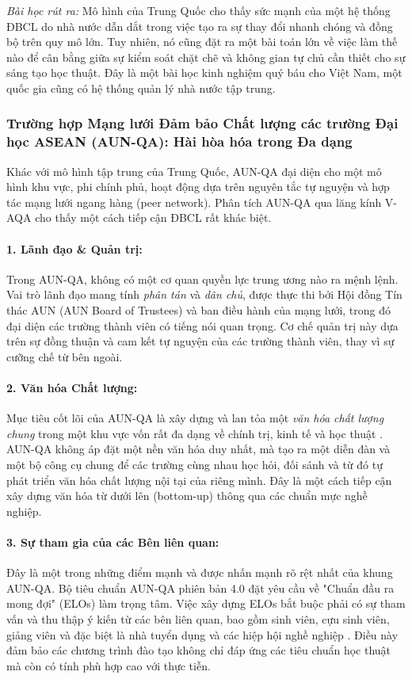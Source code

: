 \documentclass[12pt, a4paper, openany]{report}
\begin{document}
\textit{Bài học rút ra:} Mô hình của Trung Quốc cho thấy sức mạnh của một hệ thống ĐBCL do nhà nước dẫn dắt trong việc tạo ra sự thay đổi nhanh chóng và đồng bộ trên quy mô lớn. Tuy nhiên, nó cũng đặt ra một bài toán lớn về việc làm thế nào để cân bằng giữa sự kiểm soát chặt chẽ và không gian tự chủ cần thiết cho sự sáng tạo học thuật. Đây là một bài học kinh nghiệm quý báu cho Việt Nam, một quốc gia cũng có hệ thống quản lý nhà nước tập trung.

\subsubsection{Trường hợp Mạng lưới Đảm bảo Chất lượng các trường Đại học ASEAN (AUN-QA): Hài hòa hóa trong Đa dạng}
\label{subsubsec:case_aunqa}
Khác với mô hình tập trung của Trung Quốc, AUN-QA đại diện cho một mô hình khu vực, phi chính phủ, hoạt động dựa trên nguyên tắc tự nguyện và hợp tác mạng lưới ngang hàng (peer network). Phân tích AUN-QA qua lăng kính V-AQA cho thấy một cách tiếp cận ĐBCL rất khác biệt.

\paragraph{1. Lãnh đạo \& Quản trị:} Trong AUN-QA, không có một cơ quan quyền lực trung ương nào ra mệnh lệnh. Vai trò lãnh đạo mang tính \textit{phân tán} và \textit{dân chủ}, được thực thi bởi Hội đồng Tín thác AUN (AUN Board of Trustees) và ban điều hành của mạng lưới, trong đó đại diện các trường thành viên có tiếng nói quan trọng. Cơ chế quản trị này dựa trên sự đồng thuận và cam kết tự nguyện của các trường thành viên, thay vì sự cưỡng chế từ bên ngoài.

\paragraph{2. Văn hóa Chất lượng:} Mục tiêu cốt lõi của AUN-QA là xây dựng và lan tỏa một \textit{văn hóa chất lượng chung} trong một khu vực vốn rất đa dạng về chính trị, kinh tế và học thuật \cite{AUN-QA_Challenges_VN}. AUN-QA không áp đặt một nền văn hóa duy nhất, mà tạo ra một diễn đàn và một bộ công cụ chung để các trường cùng nhau học hỏi, đối sánh và từ đó tự phát triển văn hóa chất lượng nội tại của riêng mình. Đây là một cách tiếp cận xây dựng văn hóa từ dưới lên (bottom-up) thông qua các chuẩn mực nghề nghiệp.

\paragraph{3. Sự tham gia của các Bên liên quan:} Đây là một trong những điểm mạnh và được nhấn mạnh rõ rệt nhất của khung AUN-QA. Bộ tiêu chuẩn AUN-QA phiên bản 4.0 đặt yêu cầu về "Chuẩn đầu ra mong đợi" (ELOs) làm trọng tâm. Việc xây dựng ELOs bắt buộc phải có sự tham vấn và thu thập ý kiến từ các bên liên quan, bao gồm sinh viên, cựu sinh viên, giảng viên và đặc biệt là nhà tuyển dụng và các hiệp hội nghề nghiệp \cite{AUN-QAGuide}. Điều này đảm bảo các chương trình đào tạo không chỉ đáp ứng các tiêu chuẩn học thuật mà còn có tính phù hợp cao với thực tiễn.
\end{document}

